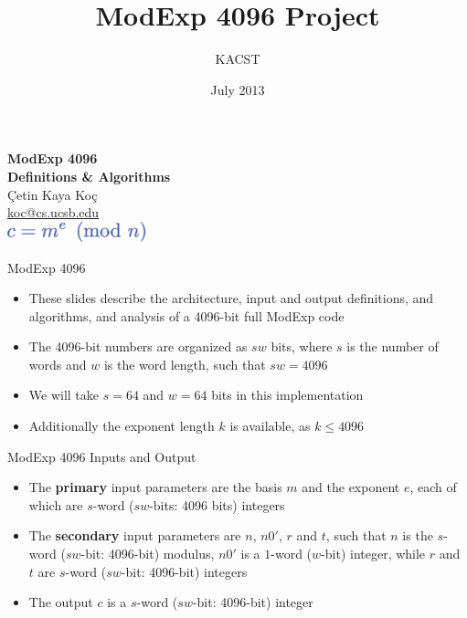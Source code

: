 \documentclass[xcolor=dvipsnames]{beamer}
\author{KACST}
\institute{}
\title{ModExp 4096 Project}
\date{July 2013}
\begin{document}
\begin{frame}
\begin{center}
\textbf{\Large ModExp 4096 \\[0.5em]
Definitions \& Algorithms}  \\[2em]
\c{C}etin Kaya Ko\c{c}  \\
\url{koc@cs.ucsb.edu} \\[3em]
\includegraphics[width=4cm]{cme.eps}
\end{center}
\end{frame}

\begin{frame}{ModExp 4096}
\begin{itemize}

\item These slides describe the architecture, input and output definitions, and
algorithms, and analysis of a 4096-bit full ModExp code

\item The 4096-bit numbers are organized as $sw$ bits, where $s$ is the number
of words and $w$ is the word length, such that $sw=4096$

\medskip

\item We will take $s=64$ and $w=64$ bits in this implementation

\item Additionally the exponent length $k$ is available, as $k \leq 4096$

\end{itemize}
\end{frame}

\begin{frame}{ModExp 4096 Inputs and Output}
\begin{itemize}

\item The \textbf{primary} input parameters are the basis $m$ and the exponent $e$, 
each of which are $s$-word ($sw$-bits: 4096 bits) integers

\medskip

\item The \textbf{secondary} input parameters are $n$, $n0'$, $r$ and $t$, such that
$n$ is the $s$-word ($sw$-bit: 4096-bit) modulus, $n0'$ is a $1$-word ($w$-bit) 
integer, while $r$ and $t$ are $s$-word ($sw$-bit: 4096-bit) integers

\medskip

\item The output $c$ is a $s$-word ($sw$-bit: 4096-bit) integer

\end{itemize}
\end{frame}
\end{document}

